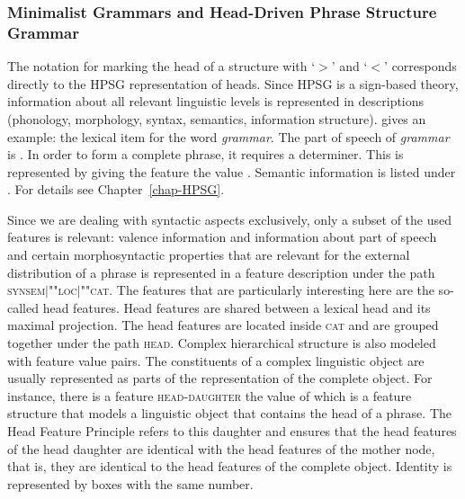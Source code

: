 \subsubsection{Minimalist Grammars and Head-Driven Phrase Structure Grammar}
\label{sec-minimalism-atb-extraction}\label{sec-mg-hpsg}

The notation for marking the head of a structure with `$>$' and `$<$' corresponds directly to the
HPSG representation of heads. Since HPSG is a sign-based theory, information about all relevant
linguistic levels is represented in descriptions (phonology, morphology, syntax, semantics,
information structure).  gives an example: the lexical item for the word \emph{grammar}.
\ea 
{}
\z
The part of speech of \emph{grammar} is . In order to form a complete phrase, it requires
a determiner. This is represented by giving the \spr feature the value . Semantic
information is listed under \cont. For details see Chapter~\ref{chap-HPSG}.

Since we are dealing with syntactic aspects exclusively, only a subset of the used features is
relevant: valence information and information about part of speech and certain
morphosyntactic properties that are relevant for the external distribution of a phrase is
represented in a feature description under the path \textsc{synsem$|$""loc$|$""cat}. The features that
are particularly interesting here are the so-called head features. Head features are shared between
a lexical head and its maximal projection. The head features are located inside \textsc{cat} and are
grouped together under the path \textsc{head}. Complex hierarchical structure is also modeled with
feature value pairs. The constituents of a complex linguistic object are usually represented as
parts of the representation of the complete object. For instance, there is a feature \textsc{head-daughter} the value of which is a feature structure that models a linguistic object that
contains the head of a phrase. The Head Feature Principle  refers to this daughter and ensures that the head
features of the head daughter are identical with the head features of the mother node, that is, they
are identical to the head features of the complete object.
\ea
{} \impl
{} 
\z
Identity is represented by boxes with the same number. 


